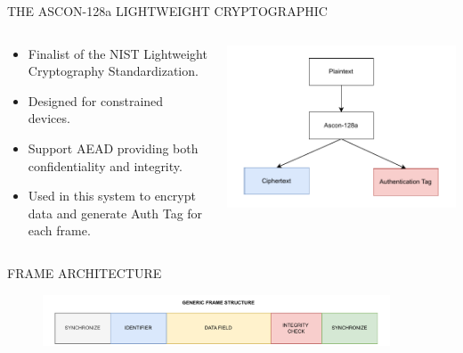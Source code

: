 \begin{frame}{THE ASCON-128a LIGHTWEIGHT CRYPTOGRAPHIC}
\begin{columns}
        \begin{column}{0.55\textwidth}
            \begin{itemize}
                \item Finalist of the NIST Lightweight Cryptography Standardization.
                \item Designed for constrained devices.
                \item Support AEAD providing both confidentiality and integrity.
                \item Used in this system to encrypt data and generate Auth Tag for each frame.
            \end{itemize}
        \end{column}
        \begin{column}{0.45\textwidth}
            \centering
            \includegraphics[width=1\linewidth]{pic/ascon.pdf}
        \end{column}
    \end{columns}
\end{frame}

\begin{frame}{FRAME ARCHITECTURE}
    \vspace{-0.32cm}
    \begin{figure}
    	\centering
    	\includegraphics[width=0.92\textwidth]{pic/gframe.pdf}
    \end{figure}
\end{frame}

